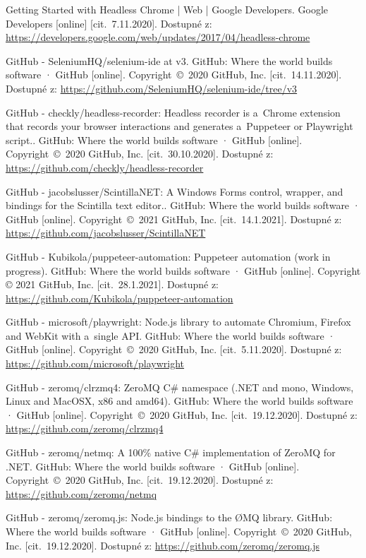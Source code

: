 \begin{thebibliography}{99}
 Getting Started with Headless Chrome  |  Web  |  Google Developers. Google Developers [online] [cit.~7.11.2020]. Dostupné z: \url{https://developers.google.com/web/updates/2017/04/headless-chrome}

 GitHub - SeleniumHQ/selenium-ide at v3. GitHub: Where the world builds software · GitHub [online]. Copyright~©~2020 GitHub, Inc. [cit.~14.11.2020]. Dostupné z: \url{https://github.com/SeleniumHQ/selenium-ide/tree/v3}

 GitHub - checkly/headless-recorder: Headless recorder is a~Chrome extension that records your browser interactions and generates a~Puppeteer or Playwright script.. GitHub: Where the world builds software · GitHub [online]. Copyright~©~2020 GitHub, Inc. [cit.~30.10.2020]. Dostupné z: \url{https://github.com/checkly/headless-recorder}

 GitHub - jacobslusser/ScintillaNET: A Windows Forms control, wrapper, and bindings for the Scintilla text editor.. GitHub: Where the world builds software · GitHub [online]. Copyright~©~2021 GitHub, Inc. [cit.~14.1.2021]. Dostupné z: \url{https://github.com/jacobslusser/ScintillaNET}

 GitHub - Kubikola/puppeteer-automation: Puppeteer automation (work in progress). GitHub: Where the world builds software · GitHub [online]. Copyright © 2021 GitHub, Inc. [cit.~28.1.2021]. Dostupné z: \url{https://github.com/Kubikola/puppeteer-automation}

 GitHub - microsoft/playwright: Node.js library to automate Chromium, Firefox and WebKit with a~single API. GitHub: Where the world builds software · GitHub [online]. Copyright~©~2020 GitHub, Inc. [cit.~5.11.2020]. Dostupné z: \url{https://github.com/microsoft/playwright}

 GitHub - zeromq/clrzmq4: ZeroMQ C\# namespace (.NET and mono, Windows, Linux and MacOSX, x86 and amd64). GitHub: Where the world builds software · GitHub [online]. Copyright~©~2020 GitHub, Inc. [cit.~19.12.2020]. Dostupné z: \url{https://github.com/zeromq/clrzmq4}

 GitHub - zeromq/netmq: A 100\% native C\# implementation of ZeroMQ for .NET. GitHub: Where the world builds software · GitHub [online]. Copyright~©~2020 GitHub, Inc. [cit.~19.12.2020]. Dostupné z: \url{https://github.com/zeromq/netmq}

 GitHub - zeromq/zeromq.js: Node.js bindings to the ØMQ library. GitHub: Where the world builds software · GitHub [online]. Copyright~©~2020 GitHub, Inc. [cit.~19.12.2020]. Dostupné z: \url{https://github.com/zeromq/zeromq.js}


\end{thebibliography}
